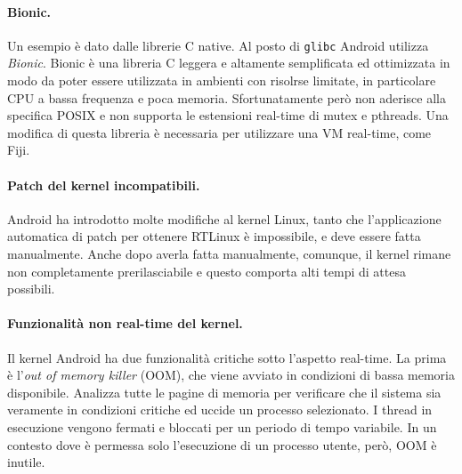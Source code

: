 \paragraph{Bionic.} Un esempio è dato dalle librerie C native. Al posto di \texttt{glibc} Android utilizza \textit{Bionic}. Bionic è una libreria C leggera e altamente semplificata ed ottimizzata in modo da poter essere utilizzata in ambienti con risolrse limitate, in particolare CPU a bassa frequenza e poca memoria. Sfortunatamente però non aderisce alla specifica POSIX e non supporta le estensioni real-time di mutex e pthreads. Una modifica di questa libreria è necessaria per utilizzare una VM real-time, come Fiji.

\paragraph{Patch del kernel incompatibili.} Android ha introdotto molte modifiche al kernel Linux, tanto che l'applicazione automatica di patch per ottenere RTLinux è impossibile, e deve essere fatta manualmente. Anche dopo averla fatta manualmente, comunque, il kernel rimane non completamente prerilasciabile e questo comporta alti tempi di attesa possibili. 

\paragraph{Funzionalità non real-time del kernel.} Il kernel Android ha due funzionalità critiche sotto l'aspetto real-time. La prima è l'\textit{out of memory killer} (OOM), che viene avviato in condizioni di bassa memoria disponibile. Analizza tutte le pagine di memoria per verificare che il sistema sia veramente in condizioni critiche ed uccide un processo selezionato. I thread in esecuzione vengono fermati e bloccati per un periodo di tempo variabile. In un contesto dove è permessa solo l'esecuzione di un processo utente, però, OOM è inutile.

